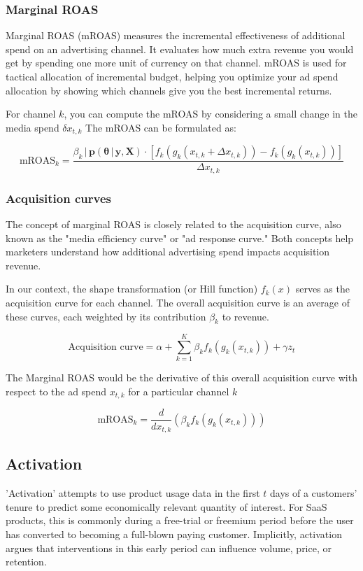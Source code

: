 \documentclass{article}
\begin{document}
\subsubsection{Marginal ROAS}

Marginal ROAS (mROAS) measures the incremental effectiveness of additional spend on an advertising channel. It evaluates how much extra revenue you would get by spending one more unit of currency on that channel. mROAS is used for tactical allocation of incremental budget, helping you optimize your ad spend allocation by showing which channels give you the best incremental returns.


For channel $k$, you can compute the mROAS by considering a small change in the media spend $\delta x_{t,k}$ The mROAS can be formulated as:

\[
\text{mROAS}_{k} = \frac{\beta_k \,|\, \mathbf{p}(\boldsymbol{\theta} \,|\, \mathbf{y}, \mathbf{X}) \cdot \left[ f_k(g_k(x_{t,k} + \Delta x_{t,k})) - f_k(g_k(x_{t,k})) \right]}{\Delta x_{t,k}}
\]


\subsubsection{Acquisition curves}

The concept of marginal ROAS is closely related to the acquisition curve, also known as the "media efficiency curve" or "ad response curve." Both concepts help marketers understand how additional advertising spend impacts acquisition revenue.

In our context, the shape transformation (or Hill function) $f_k(x)$ serves as the acquisition curve for each channel. The overall acquisition curve is an average of these curves, each weighted by its contribution $\beta_k$ to revenue.

\[
\text{Acquisition curve} = \alpha + \sum_{k=1}^{K} \beta_k f_k(g_k(x_{t,k})) + \gamma z_t
\]

The Marginal ROAS would be the derivative of this overall acquisition curve with respect to the ad spend $x_{t,k}$ for a particular channel $k$

\[
\text{mROAS}_k = \frac{d}{dx_{t,k}} \left( \beta_k f_k(g_k(x_{t,k})) \right)
\]


\subsection{Activation}

'Activation' attempts to use product usage data in the first $t$ days of a customers' tenure to predict some economically relevant quantity of interest. For SaaS products, this is commonly during a free-trial or freemium period before the user has converted to becoming a full-blown paying customer. Implicitly, activation argues that interventions in this early period can influence volume, price, or retention. \\
\end{document}
